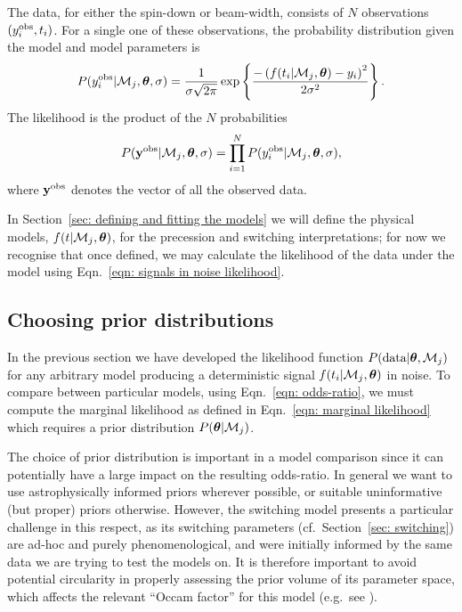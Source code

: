 \documentclass[../full_thesis/full_thesis.tex]{subfiles}
\begin{document}
The data, for either the spin-down or beam-width, consists of $N$ observations
$(y^{\textrm{obs}}_{i}, t_{i})$. For a
single one of these observations,
the probability distribution given the model and model parameters is
\begin{align}
P(y_{i}^{\textrm{obs}}| \mathcal{M}_j, \boldsymbol{\theta}, \sigma) =
\frac{1}{\sigma\sqrt{2\pi}}
\exp\left\{\frac{-\left(f(t_{i}|\mathcal{M}_j, \boldsymbol{\theta})
            - y_{i}\right)^{2}}{2\sigma^{2}}\right\}.
\end{align}
The likelihood is the product of the $N$ probabilities
\begin{equation}
P(\mathbf{y}^{\mathrm{obs}}| \mathcal{M}_{j}, \boldsymbol{\theta}, \sigma) =
              \prod_{i=1}^{N} P(y_{i}^{\textrm{obs}}|\mathcal{M}_{j}, \boldsymbol{\theta}, \sigma),
\label{eqn: signals in noise likelihood}
\end{equation}
where $\mathbf{y}^{\mathrm{obs}}$ denotes the vector of all the observed data.

In Section~\ref{sec: defining and fitting the models} we will define the physical
models, $f(t| \mathcal{M}_j, \boldsymbol{\theta})$, for the precession and
switching interpretations; for now we recognise that once defined, we may
calculate the likelihood of the data under the model using Eqn.~\eqref{eqn:
signals in noise likelihood}.

\subsection{Choosing prior distributions}
\label{sec: setting prior distributions}

In the previous section we have developed the likelihood function $P(\textrm{data}|
\boldsymbol{\theta}, \mathcal{M}_{j})$ for any arbitrary model producing a deterministic signal
$f(t_{i}|\mathcal{M}_j, \boldsymbol{\theta})$ in noise. To compare between particular models, using
Eqn.~\eqref{eqn: odds-ratio}, we must compute the marginal likelihood as
defined in Eqn.~\eqref{eqn: marginal likelihood} which requires a prior
distribution $P(\boldsymbol{\theta}|\mathcal{M}_{j})$.

The choice of prior distribution is important in a model comparison since it
can potentially have a large impact on the resulting odds-ratio.  In general we
want to use astrophysically informed priors wherever possible, or suitable
uninformative (but proper) priors otherwise. However, the switching model
presents a particular challenge in this respect, as its switching parameters
(cf.\ Section~\ref{sec: switching}) are ad-hoc and purely phenomenological, and
were initially informed by the same data we are trying to test the models on.
It is therefore important to avoid potential circularity in properly assessing
the prior volume of its parameter space, which affects the relevant ``Occam
factor'' for this model (e.g.\ see \citet{mackay2003information}).
\end{document}
